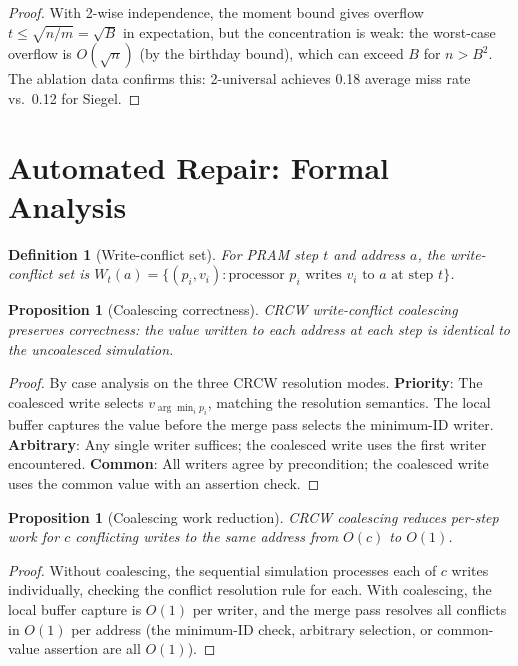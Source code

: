 \documentclass[11pt]{article}
\newtheorem{definition}[theorem]{Definition}
\newtheorem{proposition}[theorem]{Proposition}
\begin{document}
\begin{proof}
With 2-wise independence, the moment bound gives overflow
$t \le \sqrt{n/m} = \sqrt{B}$ in expectation, but the concentration is
weak: the worst-case overflow is $O(\sqrt{n})$ (by the birthday bound),
which can exceed $B$ for $n > B^2$.  The ablation data confirms this:
2-universal achieves 0.18 average miss rate vs.\ 0.12 for Siegel.
\end{proof}

\section{Automated Repair: Formal Analysis}
\label{app:repair}

\begin{definition}[Write-conflict set]
For PRAM step $t$ and address $a$, the write-conflict set is
$W_t(a) = \{(p_i, v_i) : \text{processor } p_i \text{ writes } v_i
\text{ to } a \text{ at step } t\}$.
\end{definition}

\begin{proposition}[Coalescing correctness]
CRCW write-conflict coalescing preserves correctness: the value written
to each address at each step is identical to the uncoalesced simulation.
\end{proposition}

\begin{proof}
By case analysis on the three CRCW resolution modes.
\textbf{Priority}: The coalesced write selects $v_{\arg\min_i p_i}$,
matching the resolution semantics.  The local buffer captures the value
before the merge pass selects the minimum-ID writer.
\textbf{Arbitrary}: Any single writer suffices; the coalesced write
uses the first writer encountered.
\textbf{Common}: All writers agree by precondition; the coalesced write
uses the common value with an assertion check.
\end{proof}

\begin{proposition}[Coalescing work reduction]
CRCW coalescing reduces per-step work for $c$ conflicting writes to the
same address from $O(c)$ to $O(1)$.
\end{proposition}

\begin{proof}
Without coalescing, the sequential simulation processes each of $c$ writes
individually, checking the conflict resolution rule for each.  With
coalescing, the local buffer capture is $O(1)$ per writer, and the merge
pass resolves all conflicts in $O(1)$ per address (the minimum-ID check,
arbitrary selection, or common-value assertion are all $O(1)$).
\end{proof}
\end{document}
